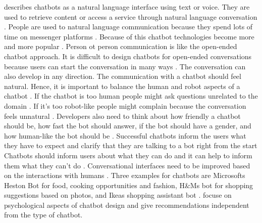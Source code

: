 \citet{brandtzaeg2018chatbots} describes chatbots as a natural language interface using text or voice.
They are used to retrieve content or access a service through natural language conversation \cite{brandtzaeg2018chatbots}.
People are used to natural language communication because they spend lots of time on messenger platforms \cite{brandtzaeg2018chatbots}.
Because of this chatbot technologies become more and more popular \cite{brandtzaeg2018chatbots}.
Person ot person communication is like the open-ended chatbot approach.
It is difficult to design chatbots for open-ended conversations because users can start the conversation
in many ways \cite{brandtzaeg2018chatbots}.
The conversation can also develop in any direction.
The communication with a chatbot should feel natural.
Hence, it is important to balance the human and robot aspects of a chatbot \cite{brandtzaeg2018chatbots}.
If the chatbot is too human people might ask questions unrelated to the domain \cite{brandtzaeg2018chatbots}.
If it's too robot-like people might complain because the conversation feels unnatural \cite{brandtzaeg2018chatbots}.
Developers also need to think about how friendly a chatbot should be, how fast the bot should answer, if the bot should
have a gender, and how human-like the bot should be \cite{brandtzaeg2018chatbots}.
Successful chatbots inform the users what they have to expect and clarify that they are talking to a bot 
right from the start \cite{brandtzaeg2018chatbots}
Chatbots should inform users about what they can do and it can help to inform them what 
they can't do \cite{brandtzaeg2018chatbots}.
Conversational interfaces need to be improved based on the interactions with humans \cite{brandtzaeg2018chatbots}.
Three examples for chatbots are Microsofts Heston Bot for food, cooking opportunities and fashion, H\&Ms bot for shopping 
suggestions based on photos, and Ikeas shopping assistant bot \cite{brandtzaeg2018chatbots}.
\citet{brandtzaeg2018chatbots} focuse on psychological aspects of chatbot design and give recommendations
independent from the type of chatbot.

